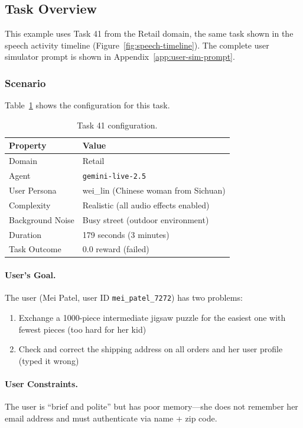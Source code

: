 \subsection{Task Overview}
\label{app:example-task}

This example uses Task 41 from the Retail domain, the same task shown in the speech activity timeline (Figure~\ref{fig:speech-timeline}). The complete user simulator prompt is shown in Appendix~\ref{app:user-sim-prompt}.

\subsubsection{Scenario}

Table~\ref{tab:task41-config} shows the configuration for this task.

\begin{table}[h]
\centering
\small
\begin{tabular}{ll}
\toprule
\textbf{Property} & \textbf{Value} \\
\midrule
Domain & Retail \\
Agent & {\texttt{gemini-live-2.5}} \\
User Persona & wei\_lin (Chinese woman from Sichuan) \\
Complexity & Realistic (all audio effects enabled) \\
Background Noise & Busy street (outdoor environment) \\
Duration & 179 seconds (3 minutes) \\
Task Outcome & 0.0 reward (failed) \\
\bottomrule
\end{tabular}
\caption{Task 41 configuration.}
\label{tab:task41-config}
\end{table}

\paragraph{User's Goal.} The user (Mei Patel, user ID \texttt{mei\_patel\_7272}) has two problems:
\begin{enumerate}
\item Exchange a 1000-piece intermediate jigsaw puzzle for the easiest one with fewest pieces (too hard for her kid)
\item Check and correct the shipping address on all orders and her user profile (typed it wrong)
\end{enumerate}

\paragraph{User Constraints.} The user is ``brief and polite'' but has poor memory---she does not remember her email address and must authenticate via name + zip code.

